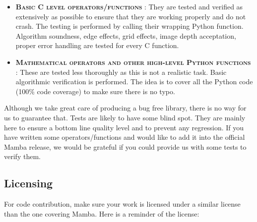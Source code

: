 \documentclass[a4paper,10pt,oneside]{article}
\begin{document}
\begin{itemize}
\item \textbf{\textsc{Basic C level operators/functions}} :
They are tested and verified as extensively as possible to ensure that they
are working properly and do not crash. The testing is performed by calling their
wrapping Python function. Algorithm soundness, edge effects,
grid effects, image depth acceptation, proper error handling are tested for every
C function.
\item \textbf{\textsc{Mathematical operators and other high-level Python functions}} :
These are tested less thoroughly as this is not a realistic task. Basic
algorithmic verification is performed. The idea is to cover all the Python code
(100\% code coverage) to make sure there is no typo.
\end{itemize}

Although we take great care of producing a bug free library, there is no way
for us to guarantee that. Tests are likely to have some blind spot. They are
mainly here to ensure a bottom line quality level and to prevent any regression.
If you have written some operators/functions and would like to add it into the
official Mamba release, we would be grateful if you could provide us with some
tests to verify them.

\subsection{Licensing}

\label{cha:Licensing}

For code contribution, make sure your work is licensed under a similar
license than the one covering Mamba. Here is a reminder of the license:

\vspace{0.5cm}
\end{document}
